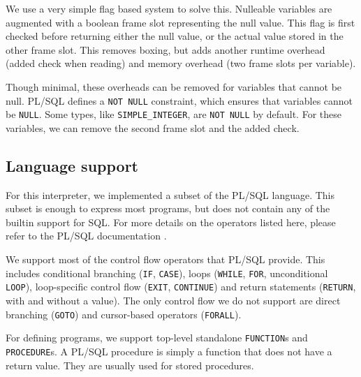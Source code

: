 \documentclass[twoside,11pt,a4paper]{article}
\newcommand{\java}[1]{\textsf{#1}}
\newcommand{\pls}[1]{\texttt{#1}}
\newcommand{\plstype}[1]{\pls{#1}}
\newcommand{\simpleint}{\plstype{SIMPLE\_INTEGER}}
\newcommand{\plsnull}{\pls{NULL}}
\begin{document}
We use a very simple flag based system to solve this. Nulleable variables are augmented with a \java{boolean} frame slot representing the null value. This flag is first checked before returning either the null value, or the actual value stored in the other frame slot. This removes boxing, but adds another runtime overhead (added check when reading) and memory overhead (two frame slots per variable).

Though minimal, these overheads can be removed for variables that cannot be null. PL/SQL defines a \pls{NOT NULL} constraint, which ensures that variables cannot be \plsnull{}. Some types, like \simpleint{}, are \pls{NOT NULL} by default. For these variables, we can remove the second frame slot and the added check.

\subsection{Language support}


For this interpreter, we implemented a subset of the PL/SQL language. This subset is enough to express most programs, but does not contain any of the builtin support for SQL. For more details on the operators listed here, please refer to the PL/SQL documentation \cite{plsdoc}.

We support most of the control flow operators that PL/SQL provide. This includes conditional branching (\pls{IF}, \pls{CASE}), loops (\pls{WHILE}, \pls{FOR}, unconditional \pls{LOOP}), loop-specific control flow (\pls{EXIT}, \pls{CONTINUE}) and return statements (\pls{RETURN}, with and without a value). The only control flow we do not support are direct branching (\pls{GOTO}) and cursor-based operators (\pls{FORALL}).

For defining programs, we support top-level standalone \pls{FUNCTION}s and \pls{PROCEDURE}s. A PL/SQL procedure is simply a function that does not have a return value. They are usually used for stored procedures.
\end{document}
